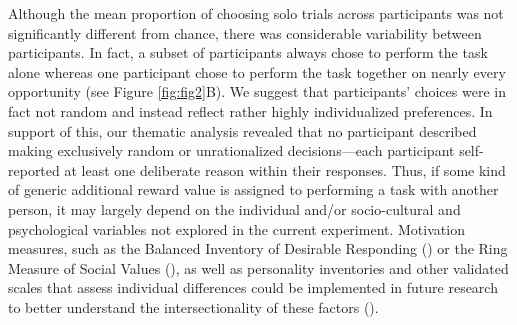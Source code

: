 \documentclass[
  man,
  floatsintext,
  longtable,
  nolmodern,
  notxfonts,
  notimes,
  mask,
  colorlinks=true,linkcolor=blue,citecolor=blue,urlcolor=blue]{apa7}
\begin{document}
Although the mean proportion of choosing solo trials across participants
was not significantly different from chance, there was considerable
variability between participants. In fact, a subset of participants
always chose to perform the task alone whereas one participant chose to
perform the task together on nearly every opportunity (see Figure
\ref{fig:fig2}B). We suggest that participants' choices were in fact not
random and instead reflect rather highly individualized preferences. In
support of this, our thematic analysis revealed that no participant
described making exclusively random or unrationalized decisions---each
participant self-reported at least one deliberate reason within their
responses. Thus, if some kind of generic additional reward value is
assigned to performing a task with another person, it may largely depend
on the individual and/or socio-cultural and psychological variables not
explored in the current experiment. Motivation measures, such as the
Balanced Inventory of Desirable Responding
() or the Ring Measure of
Social Values (), as well as personality inventories and other validated scales
that assess individual differences could be implemented in future
research to better understand the intersectionality of these factors
().
\end{document}
